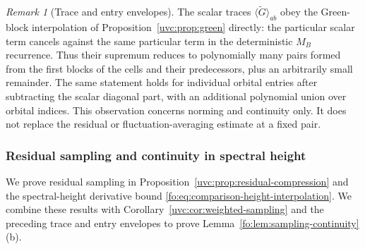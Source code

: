 \documentclass[11pt]{article}
\numberwithin{equation}{section}
\theoremstyle{remark}
\newtheorem{remark}[theorem]{Remark}
\newcommand{\wt}{\widetilde}
\begin{document}
\begin{remark}[Trace and entry envelopes]
The scalar traces $\langle\wt G\rangle_{ab}$ obey the Green-block
interpolation of Proposition~\ref{uvc:prop:green} directly: the particular
scalar term cancels against the same particular term in the deterministic
$M_B$ recurrence.
Thus their supremum reduces to polynomially many pairs formed from the
first blocks of the cells and their predecessors, plus an arbitrarily
small remainder. The same statement holds for
individual orbital entries after subtracting the scalar diagonal
part, with an additional polynomial union over orbital indices.
This observation concerns norming and continuity only.  It does not
replace the residual or fluctuation-averaging estimate at a fixed
pair.
\end{remark}

\subsubsection{Residual sampling and continuity in spectral height}
We prove residual sampling in Proposition~\ref{uvc:prop:residual-compression}
and the spectral-height derivative bound \eqref{fo:eq:comparison-height-interpolation}.
We combine these results with Corollary~\ref{uvc:cor:weighted-sampling}
and the preceding trace and entry envelopes to prove
Lemma~\ref{fo:lem:sampling-continuity}(b).
\end{document}
